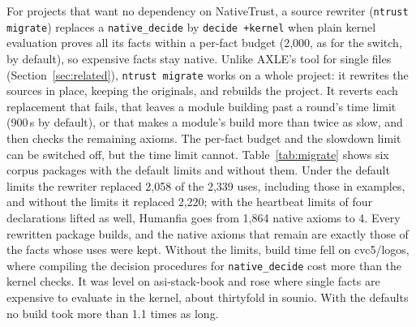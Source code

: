 \documentclass[11pt]{article}
\begin{document}
For projects that want no dependency on NativeTrust, a source rewriter (\texttt{ntrust migrate})
replaces a \texttt{native\_decide} by \texttt{decide +kernel} when plain kernel evaluation proves all its facts
within a per-fact budget (2,000, as for the switch, by default), so expensive facts stay native.
Unlike AXLE's tool for single files (Section~\ref{sec:related}), \texttt{ntrust migrate} works on a whole
project: it rewrites the sources in place, keeping the
originals, and rebuilds the project. It reverts each replacement that fails, that leaves a module
building past a round's time limit (900\,s by default), or that makes a module's build more than twice
as slow, and then checks the remaining axioms. The per-fact budget and the slowdown limit can be
switched off, but the time limit cannot. Table~\ref{tab:migrate} shows six corpus
packages with the default limits and without them. Under the default limits the rewriter replaced 2,058 of
the 2,339 uses, including those in examples, and without the limits it replaced 2,220; with the heartbeat limits of four declarations lifted as
well, Humanfia goes from 1,864 native axioms to 4. Every rewritten package builds, and the native
axioms that remain are exactly those of the facts whose uses were kept. Without the limits, build time
fell on cvc5/logos, where compiling the decision procedures for \texttt{native\_decide} cost more than
the kernel checks. It was level on asi-stack-book and rose where single facts are expensive to evaluate
in the kernel, about thirtyfold in sounio. With the defaults no build took more than 1.1
times as long.
\end{document}
